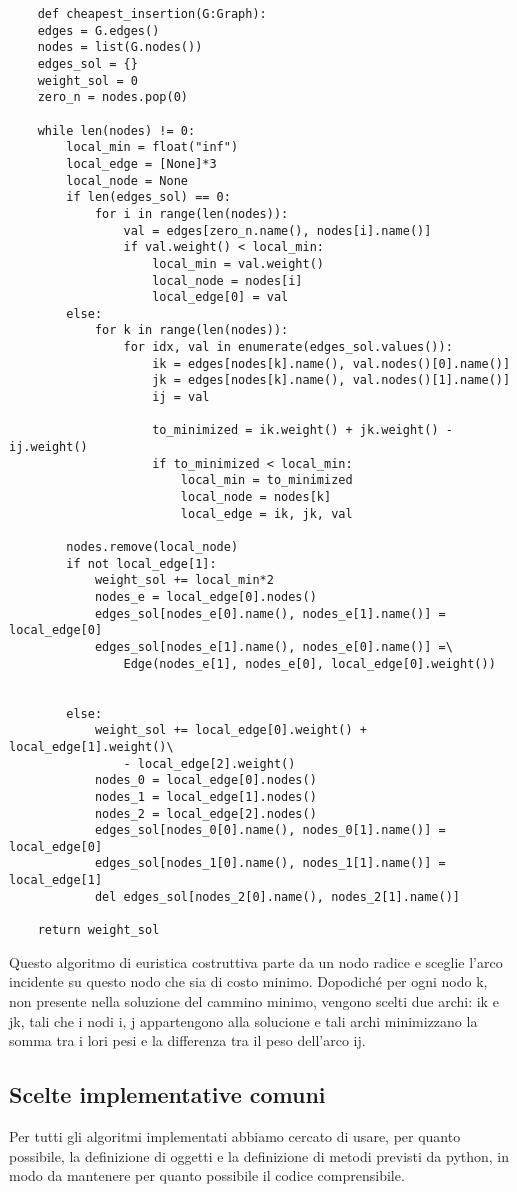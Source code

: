 \begin{verbatim}
    def cheapest_insertion(G:Graph):
    edges = G.edges()
    nodes = list(G.nodes())
    edges_sol = {}
    weight_sol = 0
    zero_n = nodes.pop(0)
    
    while len(nodes) != 0:
        local_min = float("inf")
        local_edge = [None]*3
        local_node = None
        if len(edges_sol) == 0:
            for i in range(len(nodes)):
                val = edges[zero_n.name(), nodes[i].name()]
                if val.weight() < local_min:
                    local_min = val.weight()
                    local_node = nodes[i]
                    local_edge[0] = val
        else:
            for k in range(len(nodes)):
                for idx, val in enumerate(edges_sol.values()):
                    ik = edges[nodes[k].name(), val.nodes()[0].name()]
                    jk = edges[nodes[k].name(), val.nodes()[1].name()]
                    ij = val

                    to_minimized = ik.weight() + jk.weight() - ij.weight()
                    if to_minimized < local_min:
                        local_min = to_minimized
                        local_node = nodes[k]
                        local_edge = ik, jk, val

        nodes.remove(local_node)
        if not local_edge[1]:
            weight_sol += local_min*2
            nodes_e = local_edge[0].nodes()
            edges_sol[nodes_e[0].name(), nodes_e[1].name()] = local_edge[0]
            edges_sol[nodes_e[1].name(), nodes_e[0].name()] =\
                Edge(nodes_e[1], nodes_e[0], local_edge[0].weight())
                

        else:
            weight_sol += local_edge[0].weight() + local_edge[1].weight()\
                - local_edge[2].weight()
            nodes_0 = local_edge[0].nodes()
            nodes_1 = local_edge[1].nodes()
            nodes_2 = local_edge[2].nodes()
            edges_sol[nodes_0[0].name(), nodes_0[1].name()] = local_edge[0]
            edges_sol[nodes_1[0].name(), nodes_1[1].name()] = local_edge[1]
            del edges_sol[nodes_2[0].name(), nodes_2[1].name()]

    return weight_sol
\end{verbatim}
Questo algoritmo di euristica costruttiva parte da un nodo radice e sceglie l'arco incidente su questo nodo che sia di costo minimo. 
Dopodiché per ogni nodo k, non presente nella soluzione del cammino minimo, vengono scelti due archi: ik e jk, tali che i nodi i, j appartengono alla solucione e tali archi minimizzano la somma tra i lori pesi e la differenza tra il peso dell'arco ij.

\subsection{Scelte implementative comuni\label{sec:comuni}}
Per tutti gli algoritmi implementati abbiamo cercato di usare, per quanto possibile, la definizione di oggetti e la definizione di metodi previsti da python, in modo da mantenere per quanto possibile il codice comprensibile.